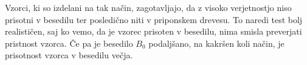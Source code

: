 Vzorci, ki so izdelani na tak način, zagotavljajo, da z visoko verjetnostjo niso prisotni v besedilu ter posledično niti v priponskem drevesu. To naredi test bolj realističen, saj ko vemo, da je vzorec prisoten v besedilu, nima smisla preverjati pristnost vzorca. Če pa je besedilo $B_0$ podaljšano, na kakršen koli način, je prisotnost vzorca v besedilu večja.